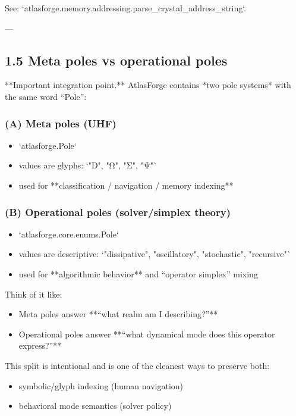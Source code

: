 \documentclass[11pt]{article}
\begin{document}
See: `atlasforge.memory.addressing.parse\_crystal\_address\_string`.

---

\subsection{1.5 Meta poles vs operational poles}

**Important integration point.**  
AtlasForge contains *two pole systems* with the same word “Pole”:

\subsubsection{(A) Meta poles (UHF)}
\begin{itemize}
\item `atlasforge.Pole`
\item values are glyphs: `"D", "Ω", "Σ", "Ψ"`
\item used for **classification / navigation / memory indexing**
\end{itemize}

\subsubsection{(B) Operational poles (solver/simplex theory)}
\begin{itemize}
\item `atlasforge.core.enums.Pole`
\item values are descriptive: `"dissipative", "oscillatory", "stochastic", "recursive"`
\item used for **algorithmic behavior** and “operator simplex” mixing
\end{itemize}

Think of it like:

\begin{itemize}
\item Meta poles answer **“what realm am I describing?”**
\item Operational poles answer **“what dynamical mode does this operator express?”**
\end{itemize}

This split is intentional and is one of the cleanest ways to preserve both:
\begin{itemize}
\item symbolic/glyph indexing (human navigation)
\item behavioral mode semantics (solver policy)
\end{itemize}
\end{document}
